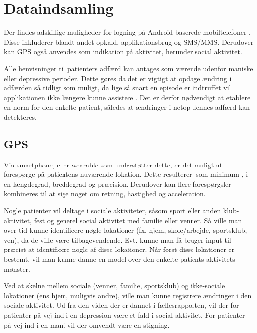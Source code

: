\section{Dataindsamling}
Der findes adskillige muligheder for logning på Android-baserede mobiltelefoner .
Disse inkluderer blandt andet opkald, applikationsbrug og SMS/MMS.
Derudover kan GPS  også anvendes som indikation på aktivitet, herunder social aktivitet.

Alle henvisninger til patienters adfærd kan antages som værende udenfor maniske eller depressive perioder.
Dette gøres da det er vigtigt at opdage ændring i adfærden så tidligt som muligt, da lige så snart en episode er indtruffet vil applikationen ikke længere kunne assistere .
Det er derfor nødvendigt at etablere en norm for den enkelte patient, således at ændringer i netop dennes adfærd kan detekteres.

\subsection{GPS}
Via smartphone, eller wearable som understøtter dette, er det muligt at forespørge på patientens nuværende lokation.
Dette resulterer, som minimum , i en længdegrad, breddegrad og præcision.
Derudover kan flere forespørgsler kombineres til at sige noget om retning, hastighed og acceleration.

Nogle patienter vil deltage i sociale aktiviteter, såsom sport eller anden klub-aktivitet, fest og generel social aktivitet med familie eller venner.
Så ville man over tid kunne identificere nøgle-lokationer (fx. hjem, skole/arbejde, sportsklub, ven), da de ville være tilbagevendende.
Evt. kunne man få bruger-input til præcist at identificere nogle af disse lokationer.
Når først disse lokationer er bestemt, vil man kunne danne en model over den enkelte patients aktivitets-mønster.

Ved at skelne mellem sociale (venner, familie, sportsklub) og ikke-sociale lokationer (ens hjem, muligvis andre), ville man kunne registrere ændringer i den sociale aktivitet.
Ud fra den viden der er dannet i fællesrapporten, vil der for patienter på vej ind i en depression være et fald i social aktivitet.
For patienter på vej ind i en mani vil der omvendt være en stigning.

